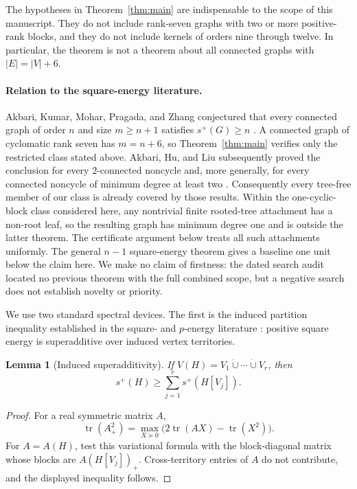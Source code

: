 \documentclass[11pt]{article}
\newtheorem{lemma}[theorem]{Lemma}
\theoremstyle{remark}
\newcommand{\splus}{s^+}
\begin{document}
The hypotheses in Theorem~\ref{thm:main} are indispensable to the scope of
this manuscript.  They do not include rank-seven graphs with two or more
positive-rank blocks, and they do not include kernels of orders nine through
twelve.  In particular, the theorem is not a theorem about all connected
graphs with $|E|=|V|+6$.

\paragraph{Relation to the square-energy literature.}
Akbari, Kumar, Mohar, Pragada, and Zhang conjectured that every connected graph
of order $n$ and size $m\geq n+1$ satisfies $\splus(G)\geq n$
\cite{AKMPZ}.  A connected graph of cyclomatic rank seven has $m=n+6$, so
Theorem~\ref{thm:main} verifies only the restricted class stated above.
Akbari, Hu, and Liu subsequently proved the conclusion for every
$2$-connected noncycle \cite{AHLTwoConnected} and, more generally, for every
connected noncycle of minimum degree at least two \cite{AHLMinDegree}.
Consequently every tree-free member of our class is already covered by those
results.  Within the one-cyclic-block class considered here, any nontrivial
finite rooted-tree attachment has a non-root leaf, so the resulting graph has
minimum degree one and is outside the latter theorem.  The certificate
argument below treats all such attachments uniformly.  The general
$n-1$ square-energy theorem \cite{LTZ} gives a baseline one unit below the
claim here.  We make no claim of firstness: the dated search audit
\cite{NoveltyAudit} located no previous theorem with the full combined scope,
but a negative search does not establish novelty or priority.

We use two standard spectral devices.  The first is the induced partition
inequality established in the square- and $p$-energy literature
\cite{LinearLowerBound,VertexPartitioning}: positive square energy is
superadditive over induced vertex territories.

\begin{lemma}[Induced superadditivity]\label{lem:super}
If $V(H)=V_1\mathbin{\dot\cup}\cdots\mathbin{\dot\cup}V_r$, then
\[
 \splus(H)\geq\sum_{j=1}^r\splus(H[V_j]).
\]
\end{lemma}

\begin{proof}
For a real symmetric matrix $A$,
\[
 \operatorname{tr}(A_+^2)
 =\max_{X\succeq0}\bigl(2\operatorname{tr}(AX)-\operatorname{tr}(X^2)\bigr).
\]
For $A=A(H)$, test this variational formula with the block-diagonal matrix
whose blocks are $A(H[V_j])_+$.  Cross-territory entries of $A$ do not
contribute, and the displayed inequality follows.
\end{proof}
\end{document}
